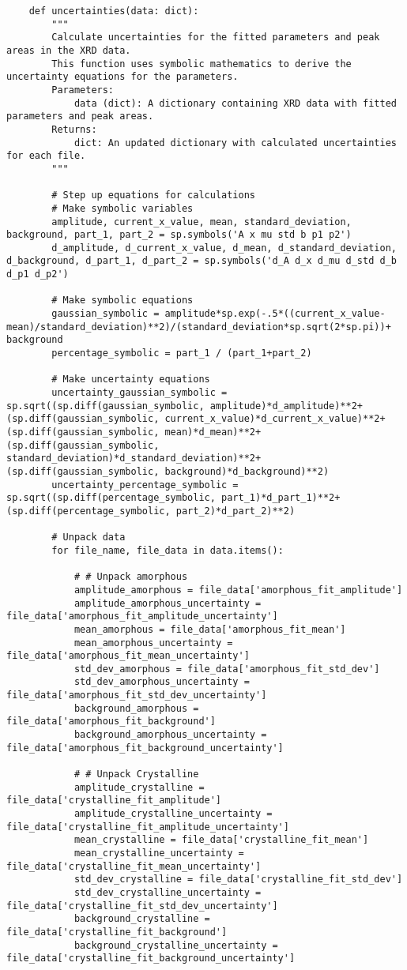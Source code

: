 \begin{lstlisting}
    def uncertainties(data: dict):
        """
        Calculate uncertainties for the fitted parameters and peak areas in the XRD data.
        This function uses symbolic mathematics to derive the uncertainty equations for the parameters.
        Parameters:
            data (dict): A dictionary containing XRD data with fitted parameters and peak areas.
        Returns:
            dict: An updated dictionary with calculated uncertainties for each file.
        """

        # Step up equations for calculations
        # Make symbolic variables
        amplitude, current_x_value, mean, standard_deviation, background, part_1, part_2 = sp.symbols('A x mu std b p1 p2')
        d_amplitude, d_current_x_value, d_mean, d_standard_deviation, d_background, d_part_1, d_part_2 = sp.symbols('d_A d_x d_mu d_std d_b d_p1 d_p2')
        
        # Make symbolic equations
        gaussian_symbolic = amplitude*sp.exp(-.5*((current_x_value-mean)/standard_deviation)**2)/(standard_deviation*sp.sqrt(2*sp.pi))+ background
        percentage_symbolic = part_1 / (part_1+part_2)

        # Make uncertainty equations
        uncertainty_gaussian_symbolic = sp.sqrt((sp.diff(gaussian_symbolic, amplitude)*d_amplitude)**2+(sp.diff(gaussian_symbolic, current_x_value)*d_current_x_value)**2+(sp.diff(gaussian_symbolic, mean)*d_mean)**2+(sp.diff(gaussian_symbolic, standard_deviation)*d_standard_deviation)**2+(sp.diff(gaussian_symbolic, background)*d_background)**2)
        uncertainty_percentage_symbolic = sp.sqrt((sp.diff(percentage_symbolic, part_1)*d_part_1)**2+(sp.diff(percentage_symbolic, part_2)*d_part_2)**2)

        # Unpack data
        for file_name, file_data in data.items():

            # # Unpack amorphous
            amplitude_amorphous = file_data['amorphous_fit_amplitude']
            amplitude_amorphous_uncertainty = file_data['amorphous_fit_amplitude_uncertainty']
            mean_amorphous = file_data['amorphous_fit_mean']
            mean_amorphous_uncertainty = file_data['amorphous_fit_mean_uncertainty']
            std_dev_amorphous = file_data['amorphous_fit_std_dev']
            std_dev_amorphous_uncertainty = file_data['amorphous_fit_std_dev_uncertainty']
            background_amorphous = file_data['amorphous_fit_background']
            background_amorphous_uncertainty = file_data['amorphous_fit_background_uncertainty']

            # # Unpack Crystalline
            amplitude_crystalline = file_data['crystalline_fit_amplitude']
            amplitude_crystalline_uncertainty = file_data['crystalline_fit_amplitude_uncertainty']
            mean_crystalline = file_data['crystalline_fit_mean']
            mean_crystalline_uncertainty = file_data['crystalline_fit_mean_uncertainty']
            std_dev_crystalline = file_data['crystalline_fit_std_dev']
            std_dev_crystalline_uncertainty = file_data['crystalline_fit_std_dev_uncertainty']
            background_crystalline = file_data['crystalline_fit_background']
            background_crystalline_uncertainty = file_data['crystalline_fit_background_uncertainty']


\end{lstlisting}
